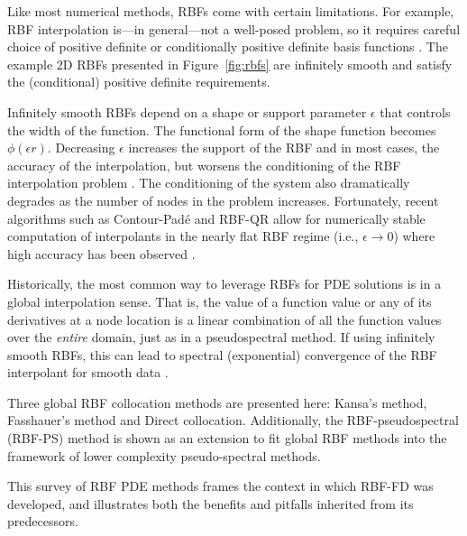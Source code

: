 \documentclass[11pt]{report}
\begin{document}
{Like most numerical methods, RBFs come with certain
limitations. For example, RBF interpolation is---in general---not a well-posed
problem, so it requires careful choice of positive definite or conditionally
positive definite basis functions \cite{Iske2004,Fasshauer2007}. 
The example 2D RBFs presented in Figure~\ref{fig:rbfs} are infinitely smooth and satisfy the (conditional) positive definite requirements. 

Infinitely smooth RBFs depend on a shape or support parameter $\epsilon$ that controls the width of the function. The functional form of the shape function becomes $\phi(\epsilon r)$. Decreasing $\epsilon$ increases the support of the RBF and in most cases, the accuracy of the interpolation, but worsens the conditioning of the RBF interpolation problem \cite{Schaback1995}. The conditioning of the system also dramatically degrades as the number of nodes in the problem increases. Fortunately, recent algorithms such as Contour-Pad\'{e} \cite{Fornberg2004} and RBF-QR \cite{Fornberg2007, Fornberg2011a} allow for numerically stable computation of interpolants in the nearly flat RBF regime (i.e., $\epsilon \rightarrow 0$) where high accuracy has been observed \cite{Larsson2003, Fornberg2008}.


Historically, the most common way to leverage RBFs for PDE solutions is in a global interpolation sense. That is, the value of a function value or any of its derivatives 
at a node location is a linear combination of all the function values over the \textit{entire} domain, just as in a pseudospectral method. If using infinitely smooth RBFs, this can lead to spectral (exponential) convergence of the RBF interpolant for smooth data \cite{Fornberg2005}. %


Three global RBF collocation methods are presented here: Kansa's method, Fasshauer's method and Direct collocation.
Additionally, the RBF-pseudospectral (RBF-PS) method is shown as an extension to fit global RBF methods into the framework of lower complexity pseudo-spectral methods. %


This survey of RBF PDE methods frames the context in which RBF-FD was developed, and illustrates both the benefits and pitfalls inherited from its predecessors. 

}
\end{document}
